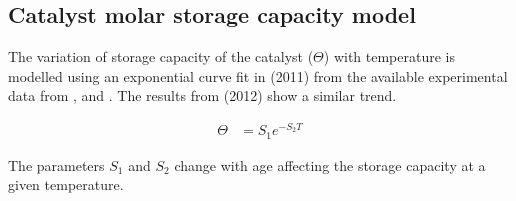 \subsection{Catalyst molar storage capacity model}
The variation of storage capacity of the catalyst ($\Theta$) with temperature is
modelled using an exponential curve fit in \cite{hsieh2011development} (2011)
from the available experimental data from
\cite{willems2007closed}, \cite{ciardelli2004scr} and \cite{joo2008study}.  The
results from \cite{schmieg2012thermal} (2012) show a similar trend.

\begin{align*}
    \Theta &= S_1 e^{-S_2 T}
\end{align*}

The parameters $S_1$ and $S_2$ change with age affecting the storage capacity at
a given temperature.

